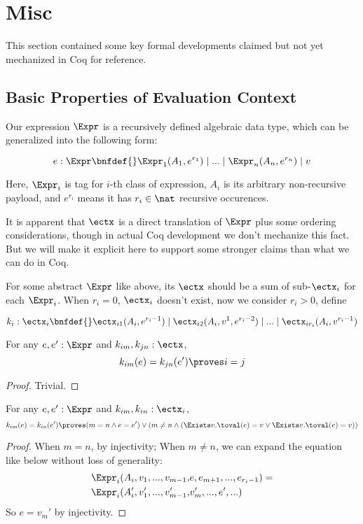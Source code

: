 \section{Misc}
\label{sec:misc}

This section contained some key formal developments claimed but not yet mechanized in Coq for reference.

\subsection{Basic Properties of Evaluation Context}

Our expression $\Expr$ is a recursively defined algebraic data type, which can be generalized into the following form:

\[
e : \Expr \bnfdef{} \Expr_1(A_1, e^{r_1}) \mid ... \mid \Expr_n(A_n, e^{r_n}) \mid v
\]

Here, $\Expr_i$ is tag for $i$-th class of expression, $A_i$ is its arbitrary non-recursive payload, and $e^{r_i}$ means
it has $r_i \in \nat$ recursive occurences.

It is apparent that $\ectx$ is a direct translation of $\Expr$ plus some ordering considerations, though in actual Coq development we don't mechanize this fact.
But we will make it explicit here to support some stronger claims than what we can do in Coq.

For some abstract $\Expr$ like above, its $\ectx$ should be a sum of sub-$\ectx_i$ for each $\Expr_i$. When $r_i = 0$, $\ectx_i$ doesn't exist, now we consider
$r_i > 0$, define

\[
k_i: \ectx_i \bnfdef{} \ectx_{i1}(A_i, e^{r_i - 1}) \mid \ectx_{i2}(A_i, v^1, e^{r_i - 2}) \mid ... \mid \ectx_{ir_i}(A_i, v^{r_i - 1})
\]

\begin{theorem}
For any $e, e': \Expr$ and $k_{im}, k_{jn}: \ectx$,
\[k_{im}(e) = k_{jn}(e') \proves i = j \]
\end{theorem}
\begin{proof} Trivial. \end{proof}

\begin{theorem}
For any $e, e': \Expr$ and $k_{im}, k_{in}: \ectx_i$,
\[k_{im}(e) = k_{in}(e') \proves
 (m = n \land e = e') \lor
 (m \neq n \land (\Exists v. \toval(e) = v \lor \Exists v. \toval(e) = v))\]
\end{theorem}
\begin{proof} 

When $m = n$, by injectivity;
When $m \neq n$, we can expand the equation like below without loss of generality:
\begin{align*}
\Expr_i(A_i, v_1, ..., v_{m - 1}, &e, e_{m + 1}, ..., e_{r_i - 1}) = \\
\Expr_i(A_i', v_1', ..., v_{m - 1}', &v_m', ..., e', ...)
\end{align*}
So $e = v_m'$ by injectivity.
\end{proof}

